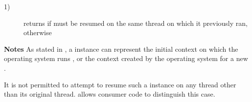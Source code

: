 \begin{description}
    \item[1)] returns  if  must be resumed on the same
              thread on which it previously ran,  otherwise
\end{description}

{\bfseries Notes}
\newline
As stated in , a \cont instance can represent the initial
context on which the operating system runs \main, or the context created by
the operating system for a new .

It is not permitted to attempt to resume such a \cont instance on any thread
other than its original thread.  allows consumer code to
distinguish this case.

